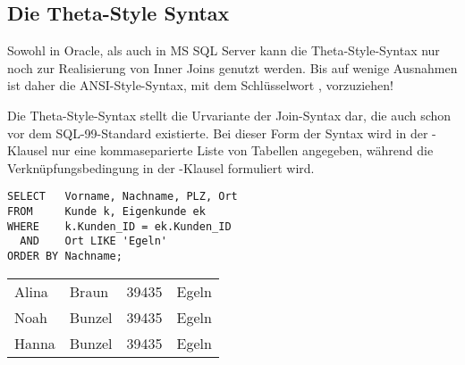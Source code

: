       \subsection{Die Theta-Style Syntax}
        \begin{merke}
          Sowohl in Oracle, als auch in MS SQL Server kann die Theta-Style-Syntax nur noch zur Realisierung von Inner Joins genutzt werden. Bis auf wenige Ausnahmen ist daher die ANSI-Style-Syntax, mit dem Schl\"usselwort , vorzuziehen!
        \end{merke}
        Die Theta-Style-Syntax stellt die Urvariante der Join-Syntax dar, die auch schon vor dem SQL-99-Standard existierte. Bei dieser Form der Syntax wird in der -Klausel nur eine kommaseparierte Liste von Tabellen angegeben, w\"ahrend die Verkn\"upfungsbedingung in der -Klausel formuliert wird.
        \begin{lstlisting}[language=oracle_sql,caption={Ein Inner Join mit Theta-Style-Syntax},label=sql04_09]
SELECT   Vorname, Nachname, PLZ, Ort
FROM     Kunde k, Eigenkunde ek
WHERE    k.Kunden_ID = ek.Kunden_ID
  AND    Ort LIKE 'Egeln'
ORDER BY Nachname;
        \end{lstlisting}
        \begin{center}
          \begin{small}
            \tablehead{}
            \tablelasttail {}
            \begin{msoraclesql}
              \begin{supertabular}{llll}
                Alina & Braun & 39435 & Egeln \\
                Noah & Bunzel & 39435 & Egeln \\
                Hanna & Bunzel & 39435 & Egeln \\
              \end{supertabular}
            \end{msoraclesql}
          \end{small}
        \end{center}

